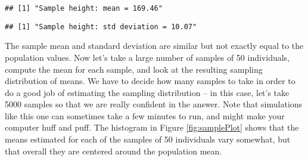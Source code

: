 \documentclass[]{book}
\newenvironment{Shaded}{\begin{snugshade}}{\end{snugshade}}
\newcommand{\KeywordTok}[1]{\textcolor[rgb]{0.13,0.29,0.53}{\textbf{#1}}}
\newcommand{\DataTypeTok}[1]{\textcolor[rgb]{0.13,0.29,0.53}{#1}}
\newcommand{\DecValTok}[1]{\textcolor[rgb]{0.00,0.00,0.81}{#1}}
\newcommand{\StringTok}[1]{\textcolor[rgb]{0.31,0.60,0.02}{#1}}
\newcommand{\CommentTok}[1]{\textcolor[rgb]{0.56,0.35,0.01}{\textit{#1}}}
\newcommand{\OtherTok}[1]{\textcolor[rgb]{0.56,0.35,0.01}{#1}}
\newcommand{\ControlFlowTok}[1]{\textcolor[rgb]{0.13,0.29,0.53}{\textbf{#1}}}
\newcommand{\OperatorTok}[1]{\textcolor[rgb]{0.81,0.36,0.00}{\textbf{#1}}}
\newcommand{\NormalTok}[1]{#1}
\theoremstyle{definition}
\theoremstyle{definition}
\theoremstyle{definition}
\theoremstyle{remark}
\begin{document}
\begin{verbatim}
## [1] "Sample height: mean = 169.46"
\end{verbatim}

\begin{Shaded}
\end{Shaded}

\begin{verbatim}
## [1] "Sample height: std deviation = 10.07"
\end{verbatim}

The sample mean and standard deviation are similar but not exactly equal
to the population values. Now let's take a large number of samples of 50
individuals, compute the mean for each sample, and look at the resulting
sampling distribution of means. We have to decide how many samples to
take in order to do a good job of estimating the sampling distribution
-- in this case, let's take 5000 samples so that we are really confident
in the answer. Note that simulations like this one can sometimes take a
few minutes to run, and might make your computer huff and puff. The
histogram in Figure \ref{fig:samplePlot} shows that the means estimated
for each of the samples of 50 individuals vary somewhat, but that
overall they are centered around the population mean.

\begin{Shaded}
\end{Shaded}
\end{document}
